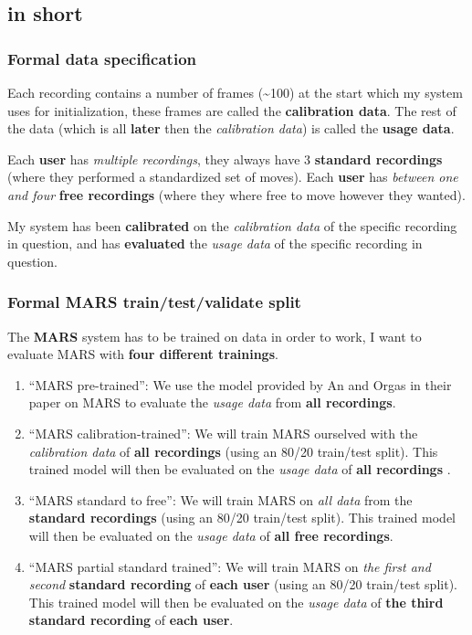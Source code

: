 \subsection*{in short}
\subsubsection*{Formal data specification}
Each recording contains a number of frames (\textasciitilde100) at the
start which my system uses for initialization, these frames are called
the \textbf{calibration data}. The rest of the data (which is all
\textbf{later} then the \emph{calibration data}) is called the
\textbf{usage data}.

Each \textbf{user} has \emph{multiple recordings}, they always have 3
\textbf{standard recordings} (where they performed a standardized set of
moves). Each \textbf{user} has \emph{between one and four} \textbf{free
recordings} (where they where free to move however they wanted).

My system has been \textbf{calibrated} on the \emph{calibration data} of
the specific recording in question, and has \textbf{evaluated} the
\emph{usage data} of the specific recording in question.

\subsubsection*{Formal MARS train/test/validate split}

The \textbf{MARS} system has to be trained on data in order to work, I
want to evaluate MARS with \textbf{four different trainings}. 
\begin{enumerate}
\item ``MARS pre-trained'': We use the model provided by An and Orgas in their paper on MARS to evaluate the \emph{usage data} from \textbf{all recordings}.
\item ``MARS calibration-trained'': We will train MARS ourselved with the \emph{calibration data} of \textbf{all recordings} (using an 80/20 train/test split).
This trained model will then be evaluated on the \emph{usage data} of \textbf{all recordings} .
\item ``MARS standard to free'': We will train MARS on \emph{all data} from the \textbf{standard recordings} (using an 80/20 train/test split). 
This trained model will then be evaluated on the \emph{usage data} of \textbf{all free recordings}. 
\item ``MARS partial standard trained'': We will train MARS on \emph{the first and second} \textbf{standard recording} of \textbf{each user} (using an 80/20 train/test split). 
This trained model will then be evaluated on the \emph{usage data} of \textbf{the third standard recording} of \textbf{each user}.
\end{enumerate}

